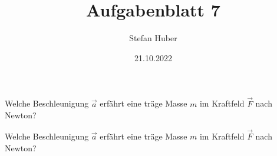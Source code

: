 \documentclass[ngerman]{exsheet2}
\title{Aufgabenblatt 7}
\date{21.10.2022}
\author{Stefan Huber}
\institute{Department IT}
\begin{document}
\maketitle

\setcounter{exsheet2@excounter}{12}

\begin{exercise}
  Welche Beschleunigung $\vec{a}$ erfährt eine träge Masse $m$ im Kraftfeld
  $\vec{F}$ nach Newton?
  \vspace{2cm}
\end{exercise}

\begin{exercise}
  Welche Beschleunigung $\vec{a}$ erfährt eine träge Masse $m$ im Kraftfeld
  $\vec{F}$ nach Newton?
  \vspace{2cm}
\end{exercise}
\end{document}
